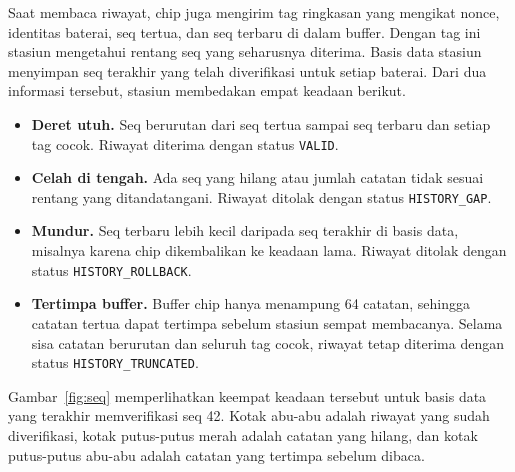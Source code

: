 \documentclass[11pt,a4paper]{article}
\begin{document}
Saat membaca riwayat, chip juga mengirim tag ringkasan yang mengikat nonce, identitas baterai,
seq tertua, dan seq terbaru di dalam buffer. Dengan tag ini stasiun mengetahui rentang seq yang
seharusnya diterima. Basis data stasiun menyimpan seq terakhir yang telah diverifikasi untuk
setiap baterai. Dari dua informasi tersebut, stasiun membedakan empat keadaan berikut.
\begin{itemize}
  \item \textbf{Deret utuh.} Seq berurutan dari seq tertua sampai seq terbaru dan setiap tag
    cocok. Riwayat diterima dengan status \texttt{VALID}.
  \item \textbf{Celah di tengah.} Ada seq yang hilang atau jumlah catatan tidak sesuai rentang
    yang ditandatangani. Riwayat ditolak dengan status \texttt{HISTORY\_GAP}.
  \item \textbf{Mundur.} Seq terbaru lebih kecil daripada seq terakhir di basis data, misalnya
    karena chip dikembalikan ke keadaan lama. Riwayat ditolak dengan status
    \texttt{HISTORY\_ROLLBACK}.
  \item \textbf{Tertimpa buffer.} Buffer chip hanya menampung 64 catatan, sehingga catatan
    tertua dapat tertimpa sebelum stasiun sempat membacanya. Selama sisa catatan berurutan dan
    seluruh tag cocok, riwayat tetap diterima dengan status \texttt{HISTORY\_TRUNCATED}.
\end{itemize}
Gambar~\ref{fig:seq} memperlihatkan keempat keadaan tersebut untuk basis data yang terakhir
memverifikasi seq 42. Kotak abu-abu adalah riwayat yang sudah diverifikasi, kotak putus-putus
merah adalah catatan yang hilang, dan kotak putus-putus abu-abu adalah catatan yang tertimpa
sebelum dibaca.
\end{document}

